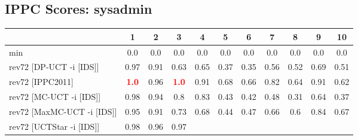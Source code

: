 \documentclass{article}
\begin{document}
\bigskip

\subsection*{IPPC Scores: sysadmin}

\begin{tabular}{|l|r@{$\pm$}rr@{$\pm$}rr@{$\pm$}rr@{$\pm$}rr@{$\pm$}rr@{$\pm$}rr@{$\pm$}rr@{$\pm$}rr@{$\pm$}rr@{$\pm$}r|}
\hline

& \multicolumn{2}{c}{1}
& \multicolumn{2}{c}{2}
& \multicolumn{2}{c}{3}
& \multicolumn{2}{c}{4}
& \multicolumn{2}{c}{5}
& \multicolumn{2}{c}{6}
& \multicolumn{2}{c}{7}
& \multicolumn{2}{c}{8}
& \multicolumn{2}{c}{9}
& \multicolumn{2}{c|}{10}
\\
\hline
\hline
min
& \multicolumn{2}{c}{0.0}
& \multicolumn{2}{c}{0.0}
& \multicolumn{2}{c}{0.0}
& \multicolumn{2}{c}{0.0}
& \multicolumn{2}{c}{0.0}
& \multicolumn{2}{c}{0.0}
& \multicolumn{2}{c}{0.0}
& \multicolumn{2}{c}{0.0}
& \multicolumn{2}{c}{0.0}
& \multicolumn{2}{c|}{0.0}
\\
rev72 [DP-UCT -i [IDS]]
& \multicolumn{2}{c}{0.97}
& \multicolumn{2}{c}{0.91}
& \multicolumn{2}{c}{0.63}
& \multicolumn{2}{c}{0.65}
& \multicolumn{2}{c}{0.37}
& \multicolumn{2}{c}{0.35}
& \multicolumn{2}{c}{0.56}
& \multicolumn{2}{c}{0.52}
& \multicolumn{2}{c}{0.69}
& \multicolumn{2}{c|}{0.51}
\\
rev72 [IPPC2011]
& \multicolumn{2}{c}{\textbf{\textcolor{red}{1.0}}}
& \multicolumn{2}{c}{0.96}
& \multicolumn{2}{c}{\textbf{\textcolor{red}{1.0}}}
& \multicolumn{2}{c}{0.91}
& \multicolumn{2}{c}{0.68}
& \multicolumn{2}{c}{0.66}
& \multicolumn{2}{c}{0.82}
& \multicolumn{2}{c}{0.64}
& \multicolumn{2}{c}{0.91}
& \multicolumn{2}{c|}{0.62}
\\
rev72 [MC-UCT -i [IDS]]
& \multicolumn{2}{c}{0.98}
& \multicolumn{2}{c}{0.94}
& \multicolumn{2}{c}{0.8}
& \multicolumn{2}{c}{0.83}
& \multicolumn{2}{c}{0.43}
& \multicolumn{2}{c}{0.42}
& \multicolumn{2}{c}{0.48}
& \multicolumn{2}{c}{0.31}
& \multicolumn{2}{c}{0.64}
& \multicolumn{2}{c|}{0.37}
\\
rev72 [MaxMC-UCT -i [IDS]]
& \multicolumn{2}{c}{0.95}
& \multicolumn{2}{c}{0.91}
& \multicolumn{2}{c}{0.73}
& \multicolumn{2}{c}{0.68}
& \multicolumn{2}{c}{0.44}
& \multicolumn{2}{c}{0.47}
& \multicolumn{2}{c}{0.66}
& \multicolumn{2}{c}{0.6}
& \multicolumn{2}{c}{0.84}
& \multicolumn{2}{c|}{0.67}
\\
rev72 [UCTStar -i [IDS]]
& \multicolumn{2}{c}{0.98}
& \multicolumn{2}{c}{0.96}
& \multicolumn{2}{c}{0.97}

\end{tabular}
\end{document}
